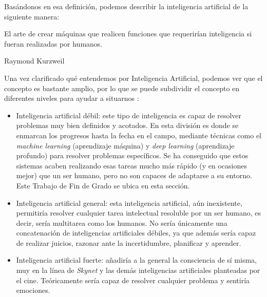 \documentclass[../main.tex]{subfiles}
\begin{document}
Basándonos en esa definición, podemos describir la inteligencia artificial de la siguiente manera:

 \begin{center}
    \begin{minipage}{0.9\linewidth}
        \vspace{5pt}%
        {\small
            El arte de crear máquinas que realicen funciones que requerirían inteligencia si fueran realizadas por humanos.
        }
        \begin{flushright} Raymond Kurzweil \cite{Garcia2012}
        \end{flushright}
        \vspace{3pt}%
    \end{minipage}
\end{center}

Una vez clarificado qué entendemos por Inteligencia Artificial, podemos ver que el concepto es bastante amplio, por lo que se puede subdividir el concepto en diferentes niveles para ayudar a situarnos \cite{Pastor2018}:

\begin{itemize}
    \item Inteligencia artificial débil: este tipo de inteligencia es capaz de resolver problemas muy bien definidos y acotados. En esta división es donde se enmarcan los progresos hasta la fecha en el campo, mediante técnicas como el \textit{machine learning} (aprendizaje máquina) y \textit{deep learning} (aprendizaje profundo) para resolver problemas específicos. Se ha conseguido que estos sistemas acaben realizando esas tareas mucho más rápido (y en ocasiones mejor) que un ser humano, pero no son capaces de adaptarse a su entorno. Este Trabajo de Fin de Grado se ubica en esta sección.
    \item Inteligencia artificial general: esta inteligencia artificial, aún inexistente, permitiría resolver cualquier tarea intelectual resoluble por un ser humano, es decir, sería multitarea como los humanos. No sería únicamente una concatenación de inteligencias artificiales débiles, ya que además sería capaz de realizar juicios, razonar ante la incertidumbre, planificar y aprender.
    \item Inteligencia artificial fuerte: añadiría a la general la consciencia de sí misma, muy en la línea de \textit{Skynet} y las demás inteligencias artificiales planteadas por el cine. Teóricamente sería capaz de resolver cualquier problema y sentiría emociones.
\end{itemize}
\end{document}
